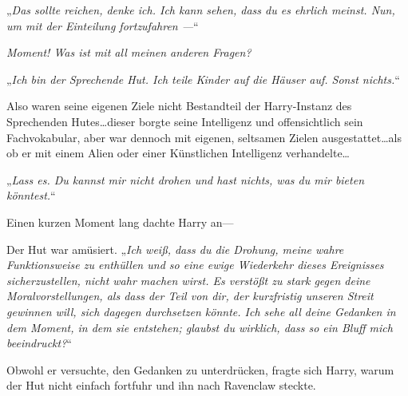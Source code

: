 „\emph{Das sollte reichen, denke ich. Ich kann sehen, dass du es ehrlich meinst. Nun, um mit der Einteilung fortzufahren —}“

\emph{Moment! Was ist mit all meinen anderen Fragen?}

„\emph{Ich bin der Sprechende Hut. Ich teile Kinder auf die Häuser auf. Sonst nichts.}“

Also waren seine eigenen Ziele nicht Bestandteil der Harry-Instanz des Sprechenden Hutes…dieser borgte seine Intelligenz und offensichtlich sein Fachvokabular, aber war dennoch mit eigenen, seltsamen Zielen ausgestattet…als ob er mit einem Alien oder einer Künstlichen Intelligenz verhandelte…

„\emph{Lass es. Du kannst mir nicht drohen und hast nichts, was du mir bieten könntest.}“

Einen kurzen Moment lang dachte Harry an—

Der Hut war amüsiert. „\emph{Ich weiß, dass du die Drohung, meine wahre Funktionsweise zu enthüllen und so eine ewige Wiederkehr dieses Ereignisses sicherzustellen, nicht wahr machen wirst. Es verstößt zu stark gegen deine Moralvorstellungen, als dass der Teil von dir, der kurzfristig unseren Streit gewinnen will, sich dagegen durchsetzen könnte. Ich sehe all deine Gedanken in dem Moment, in dem sie entstehen; glaubst du wirklich, dass so ein Bluff mich beeindruckt?}“

Obwohl er versuchte, den Gedanken zu unterdrücken, fragte sich Harry, warum der Hut nicht einfach fortfuhr und ihn nach Ravenclaw steckte.

